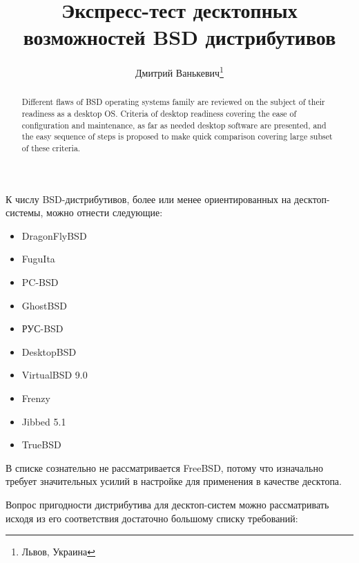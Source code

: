 \documentclass[10pt, a5paper]{article}
\begin{document}
\title{Экспресс-тест десктопных возможностей BSD дистрибутивов}%

\author{Дмитрий Ванькевич\footnote{Львов, Украина}}
\maketitle

\begin{abstract}
Different flaws of BSD operating systems family are reviewed on the subject of their readiness as a desktop OS.
Criteria of desktop readiness covering the ease of configuration and maintenance, as far as needed desktop software are presented, and
the easy sequence of steps is proposed to make quick comparison covering large subset of these criteria.
\end{abstract}

К числу BSD-дистрибутивов, более или менее ориентированных на десктоп-системы, можно отнести следующие:

\begin{itemize}
  \item DragonFlyBSD
  \item FuguIta
  \item PC-BSD
  \item GhostBSD
  \item РУС-BSD
  \item DesktopBSD
  \item VirtualBSD 9.0
  \item Frenzy
  \item Jibbed 5.1
  \item TrueBSD
\end{itemize}

В списке сознательно не рассматривается FreeBSD, потому что изначально требует значительных усилий в настройке для применения в качестве десктопа.

Вопрос пригодности дистрибутива для десктоп-систем можно рассматривать исходя из его соответствия достаточно большому списку требований:
\end{document}
